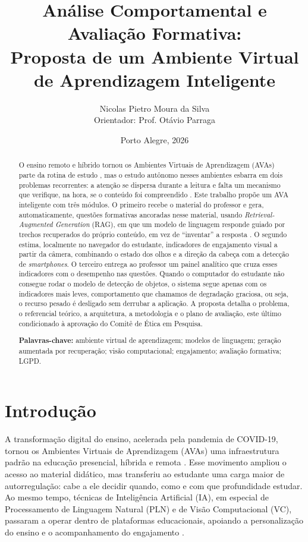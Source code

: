 \documentclass[12pt,a4paper]{article}
\title{\textbf{Análise Comportamental e Avaliação Formativa:\\ Proposta de um Ambiente Virtual de Aprendizagem Inteligente}}
\author{Nicolas Pietro Moura da Silva \\ Orientador: Prof. Otávio Parraga}
\date{Porto Alegre, 2026}
\begin{document}
\maketitle

\begin{abstract}
\noindent O ensino remoto e híbrido tornou os Ambientes Virtuais de Aprendizagem (AVAs) parte da rotina de estudo \cite{HBF19,Bat19}, mas o estudo autônomo nesses ambientes esbarra em dois problemas recorrentes: a atenção se dispersa durante a leitura \cite{KDB17} e falta um mecanismo que verifique, na hora, se o conteúdo foi compreendido \cite{DDD17}. Este trabalho propõe um AVA inteligente com três módulos. O primeiro recebe o material do professor e gera, automaticamente, questões formativas ancoradas nesse material, usando \emph{Retrieval-Augmented Generation} (RAG), em que um modelo de linguagem responde guiado por trechos recuperados do próprio conteúdo, em vez de ``inventar'' a resposta \cite{LPP20,GXG23}. O segundo estima, localmente no navegador do estudante, indicadores de engajamento visual a partir da câmera, combinando o estado dos olhos e a direção da cabeça com a detecção de \emph{smartphones}. O terceiro entrega ao professor um painel analítico que cruza esses indicadores com o desempenho nas questões. Quando o computador do estudante não consegue rodar o modelo de detecção de objetos, o sistema segue apenas com os indicadores mais leves, comportamento que chamamos de degradação graciosa, ou seja, o recurso pesado é desligado sem derrubar a aplicação. A proposta detalha o problema, o referencial teórico, a arquitetura, a metodologia e o plano de avaliação, este último condicionado à aprovação do Comitê de Ética em Pesquisa.

\vspace{0.5em}
\noindent\textbf{Palavras-chave:} ambiente virtual de aprendizagem; modelos de linguagem; geração aumentada por recuperação; visão computacional; engajamento; avaliação formativa; LGPD.
\end{abstract}

\section{Introdução}

A transformação digital do ensino, acelerada pela pandemia de COVID-19, tornou os Ambientes Virtuais de Aprendizagem (AVAs) uma infraestrutura padrão na educação presencial, híbrida e remota \cite{HBF19,Bat19}. Esse movimento ampliou o acesso ao material didático, mas transferiu ao estudante uma carga maior de autorregulação: cabe a ele decidir quando, como e com que profundidade estudar. Ao mesmo tempo, técnicas de Inteligência Artificial (IA), em especial de Processamento de Linguagem Natural (PLN) e de Visão Computacional (VC), passaram a operar dentro de plataformas educacionais, apoiando a personalização do ensino e o acompanhamento do engajamento \cite{Van11,HBF19}.
\end{document}
